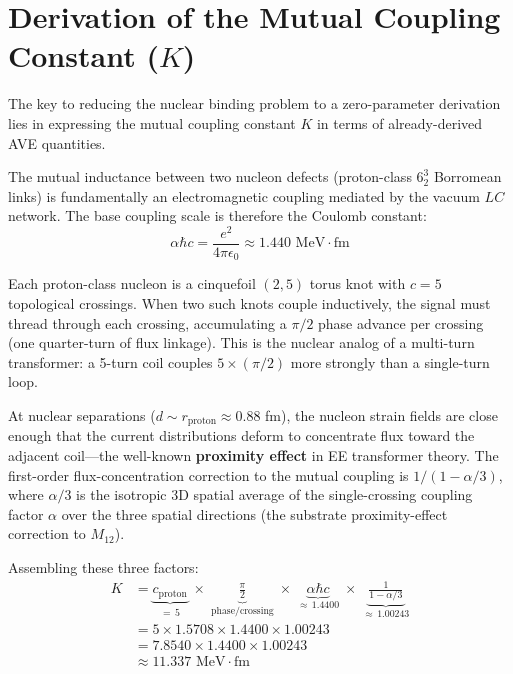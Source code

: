 \section{Derivation of the Mutual Coupling Constant ($K$)}
\label{sec:K_derivation}
The key to reducing the nuclear binding problem to a zero-parameter derivation lies in expressing the mutual coupling constant $K$ in terms of already-derived AVE quantities.

The mutual inductance between two nucleon defects (proton-class $6^3_2$ Borromean links) is fundamentally an electromagnetic coupling mediated by the vacuum $LC$ network. The base coupling scale is therefore the Coulomb constant:
\begin{equation}
    \alpha \hbar c = \frac{e^2}{4\pi\epsilon_0} \approx 1.440 \text{ MeV}\cdot\text{fm}
\end{equation}

Each proton-class nucleon is a cinquefoil $(2,5)$ torus knot with $c = 5$ topological crossings. When two such knots couple inductively, the signal must thread through each crossing, accumulating a $\pi/2$ phase advance per crossing (one quarter-turn of flux linkage). This is the nuclear analog of a multi-turn transformer: a 5-turn coil couples $5 \times (\pi/2)$ more strongly than a single-turn loop.

At nuclear separations ($d \sim r_{\text{proton}} \approx 0.88$ fm), the nucleon strain fields are close enough that the current distributions deform to concentrate flux toward the adjacent coil---the well-known \textbf{proximity effect} in EE transformer theory. The first-order flux-concentration correction to the mutual coupling is $1/(1 - \alpha/3)$, where $\alpha/3$ is the isotropic 3D spatial average of the single-crossing coupling factor $\alpha$ over the three spatial directions (the substrate proximity-effect correction to $M_{12}$).

Assembling these three factors:
\begin{align}
    K &= \underbrace{c_{\text{proton}}}_{= \, 5}
         \;\times\;
         \underbrace{\frac{\pi}{2}}_{\text{phase/crossing}}
         \;\times\;
         \underbrace{\alpha \hbar c}_{\approx\, 1.4400}
         \;\times\;
         \underbrace{\frac{1}{1 - \alpha/3}}_{\approx\, 1.00243}
    \nonumber\\[6pt]
    &= 5 \times 1.5708 \times 1.4400 \times 1.00243
    \nonumber\\[4pt]
    &= 7.8540 \times 1.4400 \times 1.00243
    \nonumber\\[4pt]
    &\approx 11.337 \text{ MeV}\cdot\text{fm}
    \label{eq:k_mutual_expanded}
\end{align}

